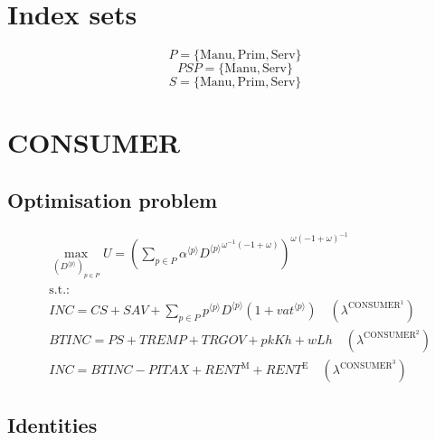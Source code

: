 

\section*{Index sets}

$$P = \{ \mathrm{Manu}, \mathrm{Prim}, \mathrm{Serv} \}$$
$${P\!S\!P} = \{ \mathrm{Manu}, \mathrm{Serv} \}$$
$$S = \{ \mathrm{Manu}, \mathrm{Prim}, \mathrm{Serv} \}$$

\section{CONSUMER}

\subsection{Optimisation problem}

\begin{align}
&\max_{\left({D}^{\langle p\rangle}\right)_{p\in P}
} U = \left(\sum_{p\in P} {{\alpha}^{\langle p\rangle}} {{{D}^{\langle p\rangle}}^{{\omega}^{-1} \left(-1 + \omega\right)}}\right)^{{\omega} \left(-1 + \omega\right)^{-1}}\\
&\mathrm{s.t.:}\nonumber\\
& {I\!N\!C} = {C\!S} + {S\!A\!V} + \sum_{p\in P} {{p}^{\langle p\rangle}} {{D}^{\langle p\rangle}} \left(1 + {{v\!a\!t}}^{\langle p\rangle}\right) \quad \left(\lambda^{\mathrm{CONSUMER}^{\mathrm{1}}}\right)\\
& {B\!T\!I\!N\!C} = {P\!S} + {T\!R\!E\!M\!P} + {T\!R\!G\!O\!V} + {{p\!k}} {{K\!h}} + {w} {{L\!h}} \quad \left(\lambda^{\mathrm{CONSUMER}^{\mathrm{2}}}\right)\\
& {I\!N\!C} = {B\!T\!I\!N\!C} - {P\!I\!T\!A\!X} + {R\!E\!N\!T}^{\mathrm{M}} + {R\!E\!N\!T}^{\mathrm{E}} \quad \left(\lambda^{\mathrm{CONSUMER}^{\mathrm{3}}}\right)
\end{align}


\subsection{Identities}

